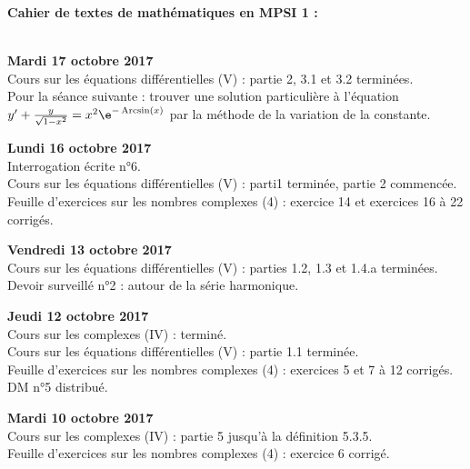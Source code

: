 \documentclass[12pt,a4paper]{article}
\begin{document}
\begin{center}
\Large\bf Cahier de textes de mathématiques en MPSI 1 :
\end{center}
\vspace{1cm}
\vspace{.4cm}\\

\noindent\textbf{Mardi 17 octobre 2017}\\
\bu{} Cours sur les équations différentielles (V) : partie 2, 3.1 et 3.2 terminées. \\
\bu{} Pour la séance suivante : trouver une solution particulière à l'équation $y' + \frac{y}{\sqrt{1-x^2}} = x^2 \e^{-\Arcsin(x)}$ par la méthode de la variation de la constante. \\
\vspace{.4cm}

\noindent\textbf{Lundi 16 octobre 2017}\\
\bu{} Interrogation écrite n°6.\\
\bu{} Cours sur les équations différentielles (V) : parti1 terminée, partie 2 commencée. \\
\bu{} Feuille d'exercices sur les nombres complexes (4) : exercice 14 et exercices 16 à 22 corrigés. \\
\vspace{.4cm}


\noindent\textbf{Vendredi 13 octobre 2017}\\
\bu{} Cours sur les équations différentielles (V) : parties 1.2, 1.3 et 1.4.a terminées. \\
\bu{} Devoir surveillé n°2 : autour de la série harmonique.\\
\vspace{.4cm}

\noindent\textbf{Jeudi 12 octobre 2017}\\
\bu{} Cours sur les complexes (IV) : terminé. \\
\bu{} Cours sur les équations différentielles (V) : partie 1.1 terminée. \\
\bu{} Feuille d'exercices sur les nombres complexes (4) : exercices 5 et 7 à 12 corrigés. \\
\bu{} DM n°5 distribué.\\
\vspace{.4cm}

\noindent\textbf{Mardi 10 octobre 2017}\\
\bu{} Cours sur les complexes (IV) : partie 5 jusqu'à la définition 5.3.5. \\
\bu{} Feuille d'exercices sur les nombres complexes (4) : exercice 6 corrigé. \\
\vspace{.4cm}
\end{document}
